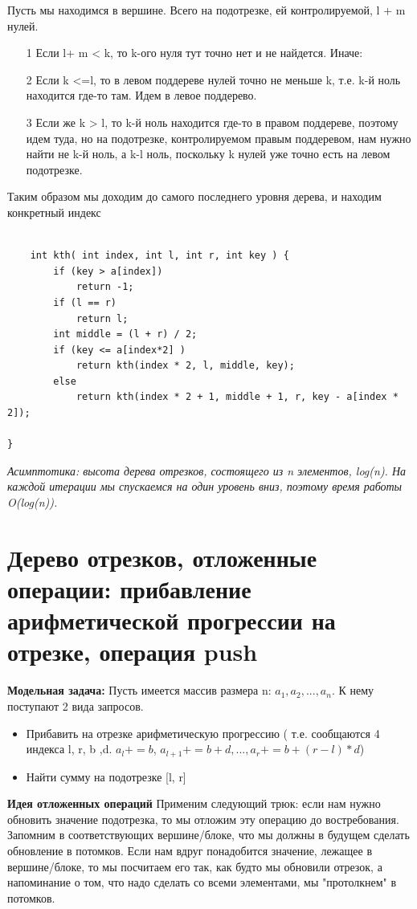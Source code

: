  Пусть мы находимся в вершине. Всего на подотрезке, ей контролируемой, l + m нулей. 
 \begin{itemize}
    \item[1] Если l+ m < k, то k-ого нуля тут точно нет и не найдется. Иначе:
    \item[2] Если k <=l, то в левом поддереве нулей точно не меньше k, т.е. k-й ноль находится где-то там. Идем в левое поддерево. 
    \item[3]Если же k > l, то k-й ноль находится где-то в правом поддереве, поэтому идем туда, но на подотрезке, контролируемом правым поддеревом, нам нужно найти не k-й ноль, а k-l ноль, поскольку k  нулей уже точно есть на левом подотрезке.
\end{itemize}

Таким образом мы доходим до самого последнего уровня дерева, и находим конкретный индекс


\begin{lstlisting}

    int kth( int index, int l, int r, int key ) {
        if (key > a[index])
            return -1;
        if (l == r)
            return l;
        int middle = (l + r) / 2;
        if (key <= a[index*2] )
            return kth(index * 2, l, middle, key);
        else
            return kth(index * 2 + 1, middle + 1, r, key - a[index * 2]);

}
\end{lstlisting}
\textit{Асимптотика: высота дерева отрезков, состоящего из n элементов, log(n). На каждой итерации мы спускаемся на один уровень вниз, поэтому время работы O(log(n)).}

\section{Дерево отрезков, отложенные операции: прибавление арифметической прогрессии на отрезке, операция push}

\textbf{Модельная задача:} Пусть имеется массив размера n: $a_1, a_2, ..., a_n$. К нему поступают 2 вида запросов.
\begin{itemize}
    \item Прибавить на отрезке арифметическую прогрессию ( т.е. сообщаются 4 индекса l, r, b ,d. $a_l += b$, $a_{l+1} += b+d, ..., a_r += b + (r-l)*d$)
    \item Найти сумму на подотрезке [l, r]
\end{itemize}

\textbf{Идея отложенных операций } Применим следующий трюк: если нам нужно обновить значение подотрезка, то мы отложим эту операцию до востребования. Запомним в соответствующих вершине/блоке, что мы должны в будущем сделать обновление в потомков. Если нам вдруг понадобится значение, лежащее в вершине/блоке, то мы посчитаем его так, как будто мы обновили отрезок, а напоминание о том, что надо сделать со всеми элементами, мы "протолкнем" в потомков.

